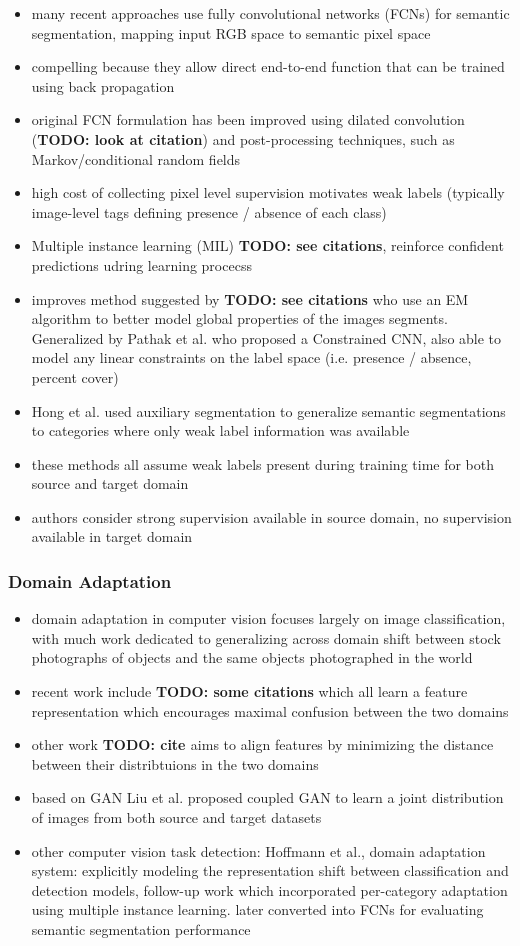 \documentclass[]{article}
\newcommand{\todo}[1]{{\color{red}\bf{TODO: #1}}}
\begin{document}
\begin{itemize}
	\item many recent approaches use fully convolutional networks (FCNs) for semantic segmentation, mapping input RGB space to semantic pixel space
	\item compelling because they allow direct end-to-end function that can be trained using back propagation
	\item original FCN formulation has been improved using dilated convolution (\todo{look at citation}) and post-processing techniques, such as Markov/conditional random fields
	\item high cost of collecting pixel level supervision motivates weak labels (typically image-level tags defining presence / absence of each class)
	\item Multiple instance learning (MIL) \todo{see citations}, reinforce confident predictions udring learning procecss
	\item improves method suggested by \todo{see citations} who use an EM algorithm to better model global properties of the images segments. Generalized by Pathak et al. who proposed a Constrained CNN, also able to model any linear constraints on the label space (i.e. presence / absence, percent cover)
	\item Hong et al. used auxiliary segmentation to generalize semantic segmentations to categories where only weak label information was available
	\item these methods all assume weak labels present during training time for both source and target domain
	\item authors consider strong supervision available in source domain, no supervision available in target domain
\end{itemize}

\subsubsection{Domain Adaptation}
\begin{itemize}
	\item domain adaptation in computer vision focuses largely on image classification, with much work dedicated to generalizing across domain shift between stock photographs of objects and the same objects photographed in the world
	\item recent work include \todo{some citations} which all learn a feature representation which encourages maximal confusion between the two domains
	\item other work \todo{cite }aims to align features by minimizing the distance between their distribtuions in the two domains
	\item based on GAN Liu et al. proposed coupled GAN to learn a joint distribution of images from both source and target datasets
	\item other computer vision task detection: Hoffmann et al., domain adaptation system: explicitly modeling the representation shift between classification and detection models, follow-up work which incorporated per-category adaptation using multiple instance learning. later converted into FCNs for evaluating semantic segmentation performance
\end{itemize}
\end{document}
